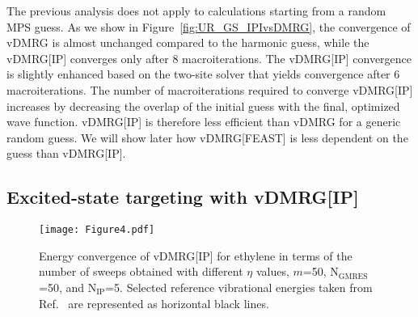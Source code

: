 \documentclass[journal=jctcce]{achemso}
\begin{document}
\noindent The previous analysis does not apply to calculations starting from a random MPS guess.
As we show in Figure~\ref{fig:UR_GS_IPIvsDMRG}, the convergence of vDMRG is almost
unchanged compared to the harmonic guess, while the vDMRG[IP] converges only after 8 macroiterations.
The vDMRG[IP] convergence is slightly enhanced based on the two-site solver that yields convergence after 6 macroiterations.
The number of macroiterations required to converge vDMRG[IP] increases by decreasing the overlap of the initial guess with the final, optimized wave function.
vDMRG[IP] is therefore less efficient than vDMRG for a generic random guess.
We will show later how vDMRG[FEAST] is less dependent on the guess than vDMRG[IP].

\subsection{Excited-state targeting with vDMRG[IP]}

\begin{figure}[htbp!]
  \centering
  \texttt{[image: Figure4.pdf]}
  \caption{Energy convergence of vDMRG[IP] for ethylene in terms of the number of sweeps obtained with different $\eta$ values, $m$=50, N$_\text{GMRES}$=50, and N$_\text{IP}$=5.
  Selected reference vibrational energies taken from Ref.~ are represented as horizontal black lines.}
  \label{fig:C2H4_IPI_CHStretching}
\end{figure}
\end{document}
